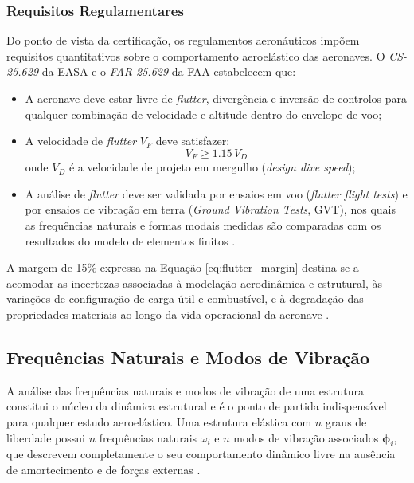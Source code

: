 \documentclass[a4paper,fleqn,noprintline]{cas-dc}
\begin{document}
\subsubsection{Requisitos Regulamentares}

Do ponto de vista da certificação, os regulamentos aeronáuticos impõem requisitos quantitativos sobre o comportamento aeroelástico das aeronaves. O \textit{CS-25.629} da EASA \cite{EASA2022} e o \textit{FAR 25.629} da FAA \cite{FAA2023} estabelecem que:

\begin{itemize}
    \item A aeronave deve estar livre de \textit{flutter}, divergência e inversão de controlos para qualquer combinação de velocidade e altitude dentro do envelope de voo;
    \item A velocidade de \textit{flutter} $V_F$ deve satisfazer:
    \begin{equation}
        V_F \geq 1.15 \, V_D
        \label{eq:flutter_margin}
    \end{equation}
    \noindent onde $V_D$ é a velocidade de projeto em mergulho 
    (\textit{design dive speed});
    \item A análise de \textit{flutter} deve ser validada por ensaios em voo (\textit{flutter flight tests}) e por ensaios de vibração em terra (\textit{Ground Vibration Tests}, GVT), nos quais as frequências naturais e formas modais medidas são comparadas com os resultados do modelo de elementos finitos \cite{Ewins2000}.
\end{itemize}

A margem de 15\% expressa na Equação \eqref{eq:flutter_margin} destina-se a acomodar as incertezas associadas à modelação aerodinâmica e estrutural, às variações de configuração de carga útil e combustível, e à degradação das propriedades materiais ao longo da vida operacional da aeronave \cite{Wright2015}.


\subsection{Frequências Naturais e Modos de Vibração}

A análise das frequências naturais e modos de vibração de uma estrutura constitui o núcleo da dinâmica estrutural e é o ponto de partida indispensável para qualquer estudo aeroelástico. Uma estrutura elástica com $n$ graus de liberdade possui $n$ frequências naturais $\omega_i$ e $n$ modos de vibração associados $\boldsymbol{\phi}_i$, que descrevem completamente o seu comportamento dinâmico livre na ausência de amortecimento e de forças externas \cite{Craig2006, Clough1993}.
\end{document}
